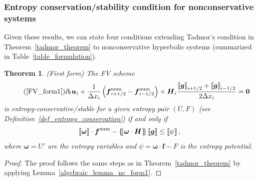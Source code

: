 \documentclass[]{scrartcl}
\newcommand*{\ldblbrace}{\{\mskip-5mu \left \{}
\newcommand*{\rdblbrace}{ \}\mskip-5mu \right \}}
\newcommand{\mean}[1]{\left\ldblbrace #1 \right\rdblbrace}
\renewcommand{\vec}[1]{\boldsymbol{#1}}
\newcommand{\jump}[1]{\left\llbracket #1  \right\rrbracket}
\newtheorem{theorem}{Theorem}[section]
\theoremstyle{definition}
\begin{document}

\subsubsection{Entropy conservation/stability condition for nonconservative systems}
Given these results, we can state four conditions extending Tadmor's condition in Theorem~\ref{tadmor_theorem} to nonconservative hyperbolic systems (summarized in Table~\ref{table_formulation}).

\begin{theorem}{(First form)}
The FV scheme
\begin{equation}
    \tag{\ref{FV_form1}}
\partial_t \vec{u}_i + \frac{1}{\Delta x_i} \left  ( \vec{f}^{\mathrm{num}}_{i+1/2} - \vec{f}^{\mathrm{num}}_{i-1/2}\right ) + \vec{H}_i \frac{ \jump{\vec{g}}_{i+1/2}+ \jump{\vec{g}}_{i-1/2}}{2 \Delta x_i}  = \vec{0}
\end{equation}
is entropy-conservative/stable for a given entropy pair $(U, F)$ (see Definition~\ref{def_entropy_conservation}) if and only if
\begin{equation}
\label{TadmorDef_form1}
\jump{\vec{\omega}} \cdot \vec{f}^\mathrm{num} -\mean{\vec{\omega} \cdot \vec{H}}\jump{\vec{g}} \leq \jump{\psi},
\end{equation}
where $\vec{\omega} = U'$ are the entropy variables and $\psi = \vec{\omega} \cdot \vec{f} - F$ is the entropy potential.
\end{theorem}
\begin{proof}
The proof follows the same steps as in Theorem~\ref{tadmor_theorem} by applying Lemma~\ref{algebraic_lemma_nc_form1}.
\end{proof}
\end{document}
